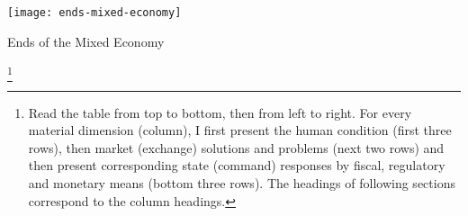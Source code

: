 
\begin{landscape}
 \begin{table}[htbp]
	\begin{center}
	\texttt{[image: ends-mixed-economy]}
	\caption{Ends of the Mixed Economy \label{tab:ends-mixed-economy}}
\end{center}
\newpage
\end{table}
\end{landscape}\footnote{
Read the table from top to bottom, then from left to right. For every material dimension (column), I first present the human condition (first three rows), then market (exchange) solutions and problems (next two rows) and then present corresponding state (command) responses by fiscal, regulatory and monetary means (bottom three rows). The headings of following sections correspond to the column headings.

}
